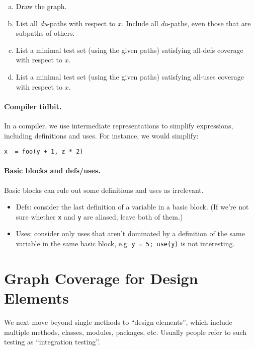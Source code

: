 \documentclass[11pt]{article}
\begin{document}
\begin{enumerate}[(a)]
\item Draw the graph.
\item List all {\it du}-paths with respect to $x$. Include
  all {\it du}-paths, even those that are subpaths of others.
\item List a minimal test set (using the given paths)
  satisfying all-defs coverage with respect to $x$.
\item List a minimal test set (using the given paths)
  satisfying all-uses coverage with respect to $x$.
\end{enumerate}

\paragraph{Compiler tidbit.} In a compiler, we use 
intermediate representations to simplify expressions, 
including definitions and uses. {\sf For instance, 
we would simplify:}

\begin{verbatim}
x  = foo(y + 1, z * 2)
\end{verbatim}

\paragraph{Basic blocks and defs/uses.} Basic
blocks can rule out some definitions and uses as irrelevant.

\begin{itemize} 
\item Defs: consider the last definition of a variable in a basic
block. (If we're not sure whether {\tt x} and {\tt y} are aliased,
leave both of them.)
\item Uses: consider only uses that aren't dominated by a
definition of the same variable in the same basic block, e.g.
{\tt y = 5; use(y)} is not interesting.
\end{itemize}

\section*{Graph Coverage for Design Elements}
We next move beyond single methods to ``design elements'', which
include multiple methods, classes, modules, packages, etc. Usually
people refer to such testing as ``integration testing''.
\end{document}
